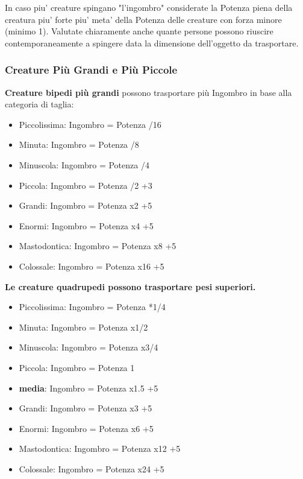 \documentclass[a4paper,11pt,twoside,openany]{book}
\begin{document}
In caso piu' creature spingano "l'ingombro" considerate la Potenza piena della creatura piu' forte piu' meta' della Potenza delle creature con forza minore (minimo 1). Valutate chiaramente anche quante persone possono riuscire contemporaneamente a spingere data la dimensione dell'oggetto da trasportare.

\subsubsection{Creature Più Grandi e Più Piccole}

\textbf{Creature bipedi più grandi} possono trasportare più Ingombro in base alla categoria di taglia:

\begin{itemize}
	\item Piccolissima: Ingombro = Potenza /16
	\item Minuta: Ingombro = Potenza /8
	\item Minuscola: Ingombro = Potenza /4
	\item Piccola: Ingombro = Potenza /2 +3
	\item Grandi: Ingombro = Potenza x2 +5
	\item Enormi: Ingombro = Potenza x4 +5
	\item Mastodontica: Ingombro = Potenza x8 +5
	\item Colossale: Ingombro = Potenza x16 +5
\end{itemize}

\bigskip


\textbf{Le creature quadrupedi possono trasportare pesi superiori. }


\begin{itemize}
	\item Piccolissima: Ingombro = Potenza *1/4
	\item Minuta: Ingombro = Potenza x1/2
	\item Minuscola: Ingombro = Potenza x3/4
	\item Piccola: Ingombro = Potenza 1
	\item \textbf{media}: Ingombro = Potenza x1.5 +5
	\item Grandi: Ingombro = Potenza x3 +5
	\item Enormi: Ingombro = Potenza x6 +5
	\item Mastodontica: Ingombro = Potenza x12 +5
	\item Colossale: Ingombro = Potenza x24 +5
\end{itemize}
\end{document}
